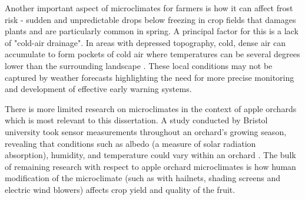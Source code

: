 Another important aspect of microclimates for farmers is how it can affect frost
risk - sudden and unpredictable drops below freezing in crop fields that
damages plants and are particularly common in spring. A principal factor for this is a
lack of "cold-air drainage". In areas with depressed topography, cold, dense air
can accumulate to form pockets of cold air where temperatures can be several
degrees lower than the surrounding landscape \cite{drepper2022}. These local
conditions may not be captured by weather forecasts highlighting the need for
more precise monitoring and development of effective early warning systems.

There is more limited research on microclimates in the context of apple orchards
which is most relevant to this dissertation. A study conducted by Bristol
university took sensor measurements throughout an orchard's growing season,
revealing that conditions such as albedo (a measure of solar radiation
absorption), humidity, and temperature could vary within an orchard
\cite{landsberg1973}. The bulk of remaining research with respect to apple
orchard microclimates is how human modification of the microclimate (such as
with hailnets, shading screens and electric wind blowers) affects crop yield and
quality of the fruit.


